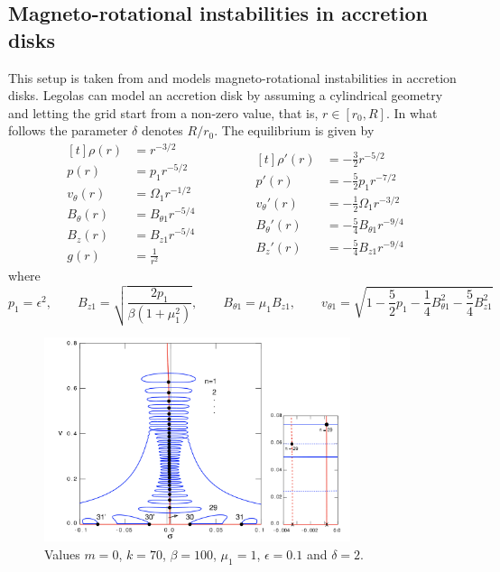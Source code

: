 \documentclass[12pt]{article}
\begin{document}
\newpage
\subsection{Magneto-rotational instabilities in accretion disks}
This setup is taken from \citet{goedbloed2018} and models magneto-rotational instabilities in accretion disks. Legolas can model an accretion disk by assuming a cylindrical geometry and letting the grid start from a non-zero value, that is, $r \in [r_0, R]$.
In what follows the parameter $\delta$ denotes $R / r_0$. The equilibrium is given by
\begin{equation*}
	\begin{aligned}[t]
		\rho(r) &= r^{-3/2} \\
		p(r) &= p_1r^{-5/2} \\
		v_\theta(r) &= \Omega_1 r^{-1/2} \\
		B_\theta(r) &= B_{\theta 1}r^{-5/4} \\
		B_z(r) &= B_{z1}r^{-5/4} \\
		g(r) &= \frac{1}{r^2}
	\end{aligned}
	\qquad\qquad
	\begin{aligned}[t]
		\rho'(r) &= -\frac{3}{2}r^{-5/2} \\
		p'(r) &= -\frac{5}{2}p_1 r^{-7/2} \\
		v_\theta'(r) &= -\frac{1}{2}\Omega_1 r^{-3/2} \\
		B_\theta'(r) &= -\frac{5}{4}B_{\theta 1}r^{-9/4} \\
		B_z'(r) &= -\frac{5}{4}B_{z1}r^{-9/4}
	\end{aligned}
\end{equation*}
where
\[ p_1 = \epsilon^2, \qquad B_{z1} = \sqrt{\frac{2p_1}{\beta(1 + \mu_1^2)}}, \qquad B_{\theta 1} = \mu_1 B_{z1}, \qquad v_{\theta 1} = \sqrt{1 - \frac{5}{2}p_1 - \frac{1}{4}B_{\theta 1}^2 - \frac{5}{4}B_{z1}^2} \]

\begin{figure}[h]
	\centering
	\includegraphics[width=0.8\textwidth]{accretion_disk.png}
	\caption{Values $m = 0$, $k = 70$, $\beta = 100$, $\mu_1 = 1$, $\epsilon = 0.1$ and $\delta = 2$.}
\end{figure}


\end{document}
